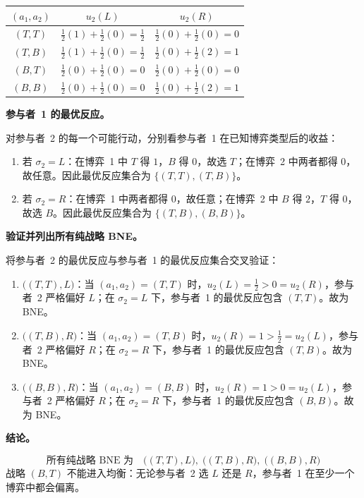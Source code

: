 \begin{center}
\renewcommand{\arraystretch}{1.30}
\begin{tabular}{c|c|c}
$(a_1,a_2)$ & $u_2(L)$ & $u_2(R)$\\
\hline
$(T,T)$ & $\tfrac12(1)+\tfrac12(0)=\tfrac12$ & $\tfrac12(0)+\tfrac12(0)=0$\\
$(T,B)$ & $\tfrac12(1)+\tfrac12(0)=\tfrac12$ & $\tfrac12(0)+\tfrac12(2)=1$\\
$(B,T)$ & $\tfrac12(0)+\tfrac12(0)=0$ & $\tfrac12(0)+\tfrac12(0)=0$\\
$(B,B)$ & $\tfrac12(0)+\tfrac12(0)=0$ & $\tfrac12(0)+\tfrac12(2)=1$\\
\hline
\end{tabular}
\end{center}

\textbf{参与者~1 的最优反应。}

对参与者~2 的每一个可能行动，分别看参与者~1 在已知博弈类型后的收益：

\begin{enumerate}[nosep]
\item 若 $\sigma_2=L$：在博弈~1 中 $T$ 得 $1$，$B$ 得 $0$，故选 $T$；在博弈~2 中两者都得 $0$，故任意。因此最优反应集合为 $\{(T,T),(T,B)\}$。
\item 若 $\sigma_2=R$：在博弈~1 中两者都得 $0$，故任意；在博弈~2 中 $B$ 得 $2$，$T$ 得 $0$，故选 $B$。因此最优反应集合为 $\{(T,B),(B,B)\}$。
\end{enumerate}

\textbf{验证并列出所有纯战略 BNE。}

将参与者~2 的最优反应与参与者~1 的最优反应集合交叉验证：

\begin{enumerate}[label=(\roman*)]
\item $\bigl((T,T),L\bigr)$：当 $(a_1,a_2)=(T,T)$ 时，$u_2(L)=\tfrac12>0=u_2(R)$，参与者~2 严格偏好 $L$；在 $\sigma_2=L$ 下，参与者~1 的最优反应包含 $(T,T)$。故为 BNE。
\item $\bigl((T,B),R\bigr)$：当 $(a_1,a_2)=(T,B)$ 时，$u_2(R)=1>\tfrac12=u_2(L)$，参与者~2 严格偏好 $R$；在 $\sigma_2=R$ 下，参与者~1 的最优反应包含 $(T,B)$。故为 BNE。
\item $\bigl((B,B),R\bigr)$：当 $(a_1,a_2)=(B,B)$ 时，$u_2(R)=1>0=u_2(L)$，参与者~2 严格偏好 $R$；在 $\sigma_2=R$ 下，参与者~1 的最优反应包含 $(B,B)$。故为 BNE。
\end{enumerate}

\textbf{结论。}

\[
	\boxed{
	\text{所有纯战略 BNE 为}\quad
	\bigl((T,T),L\bigr),\;
	\bigl((T,B),R\bigr),\;
	\bigl((B,B),R\bigr)
	}
\]\indent
战略 $(B,T)$ 不能进入均衡：无论参与者~2 选 $L$ 还是 $R$，参与者~1 在至少一个博弈中都会偏离。


